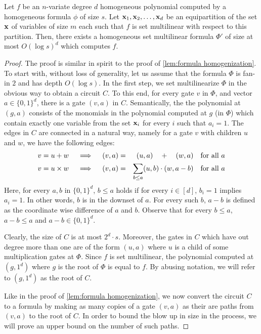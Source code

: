 \begin{lemma}\label{lem:formula set-multilinearization}
  Let $f$ be an $n$-variate degree $d$ homogeneous polynomial computed by a homogeneous formula $\phi$ of size $s$.
Let $\mathbf{x}_1, \mathbf{x}_2, \ldots, \mathbf{x}_d$ be an equipartition of the set $\mathbf{x}$ of variables of size $m$ each such that $f$ is set multilinear with respect to this partition.
Then, there exists a homogeneous set multilinear formula $\Phi'$ of size at most $O(\log s)^d$ which computes $f$.
\end{lemma}
\begin{proof}
  The proof is similar in spirit to the proof of \autoref{lem:formula homogenization}.
To start with, without loss of generality, let us assume that the formula $\Phi$ is fan-in $2$ and has depth $O(\log s)$.
In the first step, we set multilinearize $\Phi$ in the obvious way to obtain a circuit $C$.
To this end, for every gate $v$ in $\Phi$, and vector $a \in \{0,1\}^d$, there is a gate $(v, a)$ in $C$.
Semantically, the the polynomial at $(g,a)$ consists of the monomials in the polynomial computed at $g$ (in $\Phi$) which contain exactly one variable from the set $\mathbf{x}_i$ for every $i$ such that $a_i = 1$.
The edges in $C$ are connected in a natural way, namely for a gate $v$ with children $u$ and $w$, we have the following edges:
\begin{eqnarray*}
\text{$v = u + w$}\quad\implies\quad (v, a) &=& (u, a) \quad + \quad (w, a)\quad\text{for all $a$}\\
\text{$v = u \times w$}\quad\implies\quad (v, a) &=& \sum_{b \leq a} (u, b)\cdot (w, a-b) \quad\text{for all $a$}
\end{eqnarray*}
Here, for every $a, b$ in $\{0,1\}^d$, $b \leq a $ holds if for every $i \in [d]$, $b_i = 1$ implies $a_i = 1$.
In other words, $b$ is in the downset of $a$.
For every such $b$, $a-b$ is defined as the coordinate wise difference of $a$ and $b$.
Observe that for every $b \leq a$, $a-b \leq a$ and $a-b \in \{0,1\}^d$.
 
Clearly, the size of $C$ is at most $2^d\cdot s$.
Moreover, the gates in $C$ which have out degree more than one are of the form $(u,a)$ where $u$ is a child of some multiplication gates at $\Phi$.
Since $f$ is set multilinear, the polynomial computed at $(g, 1^d)$ where $g$ is the root of $\Phi$ is equal to $f$.
By abusing notation, we will refer to $(g, 1^d)$ as the root of $C$.
 
Like in the proof of \autoref{lem:formula homogenization}, we now convert the circuit $C$ to a formula by making as many copies of a gate  $(v, a)$ as their are paths from  $(v,a)$ to the root of $C$. In order to bound the blow up in size in the process, we will prove an upper bound on the number of such paths. 


\end{proof}
